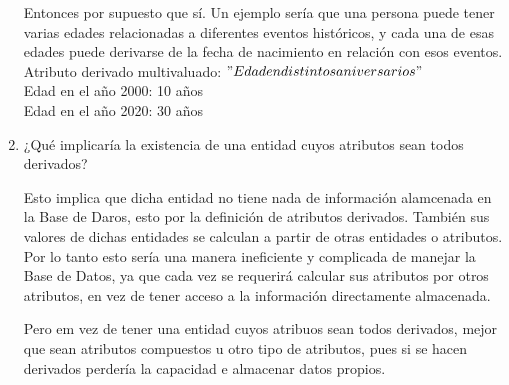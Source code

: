 \begin{enumerate}
Entonces por supuesto que sí. Un ejemplo sería que una persona puede tener varias edades relacionadas a diferentes eventos históricos, y cada una de esas edades puede derivarse de la fecha de nacimiento en relación con esos eventos. \\

Atributo derivado multivaluado: $"Edad en distintos aniversarios"$ \\
Edad en el año 2000: 10 años \\
Edad en el año 2020: 30 años \\

    \item ¿Qué implicaría la existencia de una entidad cuyos atributos sean todos derivados?

Esto implica que dicha entidad no tiene nada de información alamcenada en la Base de Daros, esto por la definición de atributos derivados. También sus valores de dichas entidades se calculan a partir de otras entidades o atributos. \\

Por lo tanto esto sería una manera ineficiente y complicada de manejar la Base de Datos, ya que cada vez se requerirá calcular sus atributos por otros atributos, en vez de tener acceso a la información directamente almacenada.

Pero em vez de tener una entidad cuyos atribuos sean todos derivados, mejor que sean atributos compuestos u otro tipo de atributos, pues si se hacen derivados perdería la capacidad e almacenar datos propios.

\end{enumerate}

